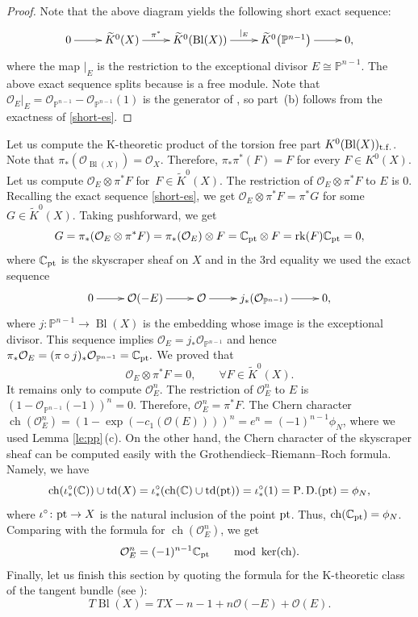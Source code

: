 \documentclass[pdftex]{sigma}
\numberwithin{equation}{section}
\newcommand{\CC}{\mathbb{C}}
\newcommand{\ZZ}{\mathbb{Z}}
\newcommand{\PP}{\mathbb{P}}
\renewcommand{\O}{\mathcal{O}}
\begin{document}
\begin{proof}
Note that the above diagram yields the following short exact sequence:
\begin{equation}\label{short-es}
\xymatrix{
 0\ar[r] &
 \widetilde{K}^0(X)\ar[r]^-{\pi^*} &
 \widetilde{K}^0(\operatorname{Bl}(X)) \ar[r]^-{|_E} &
 \widetilde{K}^0\big(\PP^{n-1}\big)\ar[r] & 0, }
\end{equation}
where the map $|_E$ is the restriction to the exceptional divisor
$E\cong \PP^{n-1}$. The above exact sequence splits because \smash{$\widetilde{K}^0\big(\PP^{n-1}\big)\cong \ZZ^{n-1}$} is a free module. Note that
$\O_E|_E = \O_{\PP^{n-1}}-\O_{\PP^{n-1}}(1)$ is the generator of
\smash{$\widetilde{K}^0\big(\PP^{n-1}\big)$}, so part~(b) follows from the exactness of
\eqref{short-es}.
\end{proof}

Let us compute the K-theoretic product of the torsion free part $K^0(\operatorname{Bl}(X))_{\rm t.f.}$. Note that
$\pi_*(\O_{\operatorname{Bl}(X)})=\O_X$. Therefore, $\pi_*\pi^*(F)=F$ for
every $F\in K^0(X)$. Let us compute $\O_E\otimes \pi^*F$ for~$F\in \widetilde{K}^0(X)$. The
restriction of $\O_E\otimes \pi^*F$ to $E$ is 0. Recalling the exact sequence
\eqref{short-es}, we get $\O_E\otimes \pi^*F=\pi^*G$ for some $G\in
\widetilde{K}^0(X)$. Taking pushforward, we get
\[
G=\pi_*(\O_E\otimes \pi^*F) = \pi_*(\O_E)\otimes F =
\CC_{{\rm pt}}\otimes F = \operatorname{rk}(F)
\CC_{{\rm pt}} =0,
\]
where $\CC_{{\rm pt}}$ is the skyscraper sheaf on $X$ and in the
3rd equality we used the exact sequence
\[
\xymatrix{
0\ar[r] & \O(-E)\ar[r] &\O \ar[r] & j_*(\O_{\PP^{n-1}}) \ar[r] & 0,}
\]
where $j\colon\PP^{n-1}\to \operatorname{Bl}(X)$ is the embedding whose image
is the exceptional divisor. This sequence implies
$\O_E=j_*\O_{\PP^{n-1}}$ and hence $\pi_* \O_E=
(\pi\circ j)_*\O_{\PP^{n-1}} = \CC_{{\rm pt}}.$ We proved
that
\[
\O_E\otimes \pi^*F=0,\qquad \forall F\in \widetilde{K}^0(X).
\]
It remains only to compute $\O_E^n$. The restriction of $\O_E^n$ to
$E$ is $(1-\O_{\PP^{n-1}}(-1))^n = 0$. Therefore, $\O_E^n =\pi^*
F$. The Chern character $\operatorname{ch}(\O_E^n) =
(1-\exp(-c_1(\O(E))) )^n = e^n = (-1)^{n-1} \phi_N$, where we used
Lemma \ref{le:pp}\,(c). On the other hand, the Chern character of
the skyscraper sheaf can be computed easily with the Grothendieck--Riemann--Roch
formula. Namely, we have
\[
\operatorname{ch}(\iota^\circ_*(\CC) )\cup \operatorname{td}(X) =
\iota^\circ_* (\operatorname{ch}(\CC)\cup \operatorname{td}({\rm pt}))
=
\iota^\circ_* (1) = \operatorname{P.D.}({\rm pt}) = \phi_N,
\]
where $\iota^\circ\colon {\rm pt}\to X$ is the natural inclusion of the point
${\rm pt}$. Thus, %
$\operatorname{ch}(\CC_{{\rm pt}}) = \phi_N$. Comparing with the
formula for $\operatorname{ch}(\O_E^n) $, we get
\[
\O_E^n = (-1)^{n-1} \CC_{{\rm pt}}\qquad
\operatorname{mod} \ \operatorname{ker}(\operatorname{ch}).
\]
Finally, let us finish this section by quoting the formula for the
K-theoretic class of the tangent bundle (see \cite[Lemma 15.4]{Fu}):
\[%
T\operatorname{Bl}(X) = TX-n-1 + n \O(-E)+\O(E).
\]
\end{document}
